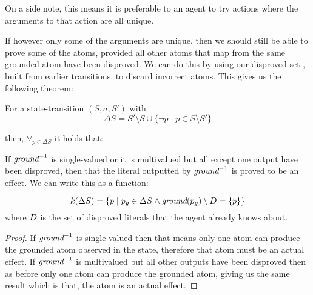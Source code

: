 \documentclass[../Master.tex]{subfiles}
\begin{document}
On a side note, this means it is preferable to an agent to try actions where the arguments to that action are all unique. 

If however only some of the arguments are unique, then we should still be able to prove some of the atoms, provided all other atoms that map from the same grounded atom have been disproved. We can do this by using our disproved set \Dsp, built from earlier transitions, to discard incorrect atoms. This gives us the following theorem: 

\begin{theorem} For a state-transition $(S,a,S')$ with 
	\begin{equation*}
	\Delta S = S' \setminus S \cup \{\neg p \mid  p \in S \setminus S' \}
	\end{equation*}
	
	then, 
	 $\forall_{p \in \Delta S}$ it holds that:
	
	If $\textit{ground} ^{-1}$ is single-valued or it is multivalued but all except one output have been disproved, then that the literal outputted by $\textit{ground} ^{-1}$ is proved to be an effect.
	We can write this as a function:
	
	\begin{equation*}
	k(\Delta S) = 
	\left\{
		p \mid 
				p_g \in \Delta S \land 
				\textit{ground}(p_g) \setminus D = \{p\}
		\right\}
	\end{equation*}
	where $D$ is the set of disproved literals that the agent already knows about.
	
	\begin{proof}
		If $\textit{ground} ^{-1}$ is single-valued then that means only one atom can produce the grounded atom observed in the state, therefore that atom must be an actual effect.
		If $\textit{ground} ^{-1}$ is multivalued but all other outputs have been disproved then as before only one atom can produce the grounded atom, giving us the same result which is that, the atom is an actual effect.
	\end{proof}
\end{theorem}
\end{document}
